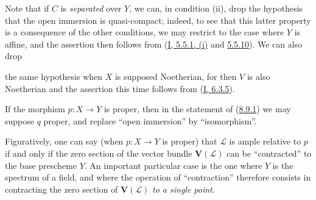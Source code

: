 Note that if $C$ is \emph{separated} over $Y$, we can, in condition
(ii), drop the hypothesis that the open immersion is quasi-compact; indeed,
to see that this latter property is a consequence of the other conditions,
we may restrict to the case where $Y$ is affine, and the assertion then
follows from (\hyperref[I.5.5.1]{I, 5.5.1, (i)} and
\hyperref[I.5.5.10]{5.5.10}). We can also drop

the same hypothesis when $X$ is supposed Noetherian, for then $V$ is also
Noetherian and the assertion this time follows from
(\hyperref[I.6.3.5]{I, 6.3.5}).

\begin{corollary}[8.9.2]
\label{II.8.9.2}
If the morphism $p:X\to Y$ is proper, then in the statement of
(\hyperref[II.8.9.1]{8.9.1}) we may suppose $q$ proper, and replace
``open immersion'' by ``isomorphism''.
\end{corollary}

Figuratively, one can say (when $p:X\to Y$ is proper) that
$\mathcal{L}$ is ample relative to $p$ if and only if the zero section of the
vector bundle $\mathbf{V}(\mathcal{L})$ can be ``contracted'' to the base
prescheme $Y$. An important particular case is the one where $Y$ is the
spectrum of a field, and where the operation of ``contraction'' therefore
consists in contracting the zero section of $\mathbf{V}(\mathcal{L})$ \emph{to
a single point}.

